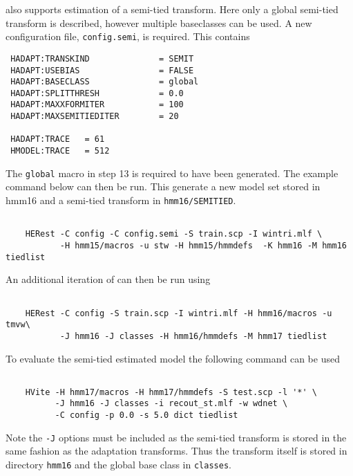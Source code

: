  also supports estimation of a semi-tied transform. Here only a global
semi-tied transform is described, however multiple baseclasses can be used. A new
configuration file, \texttt{config.semi}, is required. This contains
\begin{verbatim}
 HADAPT:TRANSKIND              = SEMIT
 HADAPT:USEBIAS                = FALSE
 HADAPT:BASECLASS              = global
 HADAPT:SPLITTHRESH            = 0.0
 HADAPT:MAXXFORMITER           = 100
 HADAPT:MAXSEMITIEDITER        = 20

 HADAPT:TRACE   = 61
 HMODEL:TRACE   = 512
\end{verbatim}
The \texttt{global} macro in step 13 is required to have been generated. The example
command below can then be run. This generate a new model set stored in hmm16 and 
a semi-tied transform in \texttt{hmm16/SEMITIED}.
\begin{verbatim}

    HERest -C config -C config.semi -S train.scp -I wintri.mlf \
           -H hmm15/macros -u stw -H hmm15/hmmdefs  -K hmm16 -M hmm16 tiedlist

\end{verbatim}
An additional iteration of  can then be run using
\begin{verbatim}

    HERest -C config -S train.scp -I wintri.mlf -H hmm16/macros -u tmvw\
           -J hmm16 -J classes -H hmm16/hmmdefs -M hmm17 tiedlist

\end{verbatim}
To evaluate the semi-tied estimated model the following command can be used
\begin{verbatim}

    HVite -H hmm17/macros -H hmm17/hmmdefs -S test.scp -l '*' \ 
          -J hmm16 -J classes -i recout_st.mlf -w wdnet \ 
          -C config -p 0.0 -s 5.0 dict tiedlist

\end{verbatim}
Note the {\tt -J} options must be included as the semi-tied transform is
stored in the same fashion as the adaptation transforms. Thus the transform
itself is stored in directory {\tt hmm16} and the global base class in {\tt classes}.

